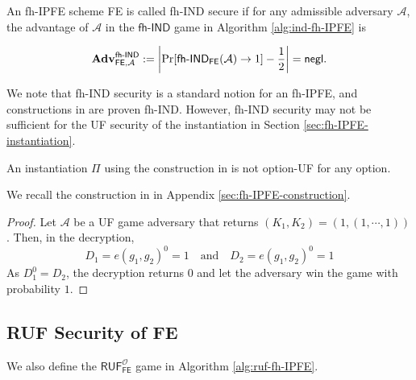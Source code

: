 \begin{definition}

	An fh-IPFE scheme \textsf{FE} is called fh-IND secure if for any admissible adversary $\mathcal{A}$, the advantage of $\mathcal{A}$ in the $\textsf{fh-IND}$ game in Algorithm \ref{alg:ind-fh-IPFE} is

\[
	\mathbf{Adv}_{\textsf{FE}, \mathcal{A}}^{\textsf{fh-IND}} := \left| \Pr[\textsf{fh-IND}_{\textsf{FE}}(\mathcal{A}) \to 1 ] - \frac{1}{2} \right| = \mathsf{negl}.
\]

\end{definition}

We note that fh-IND security is a standard notion for an fh-IPFE, and constructions in \cite{cryptoeprint:2015/1255, 10.1007/978-3-319-45871-7_24, cryptoeprint:2016/440} are proven fh-IND. However, fh-IND security may not be sufficient for the UF security of the instantiation in Section \ref{sec:fh-IPFE-instantiation}. 

\begin{theorem}
\label{thm:fh-IPFE-not-uf}
An instantiation $\Pi$ using the construction in \cite{cryptoeprint:2016/440} is not \textsf{option}-UF for any \textsf{option}.

\end{theorem}

\noindent We recall the construction in \cite{cryptoeprint:2016/440} in Appendix \ref{sec:fh-IPFE-construction}.

\begin{proof}

Let $\mathcal{A}$ be a \textsf{UF} game adversary that returns $(K_1, K_2) = (1, (1, \cdots, 1))$. Then, in the decryption,
\[
	D_1 = e(g_1, g_2)^{0} = 1 \quad \text{and} \quad D_2 = e(g_1, g_2)^0 = 1
\]
As $D_1^0 = D_2$, the decryption returns $0$ and let the adversary win the game with probability $1$.

\end{proof}


\subsection{RUF Security of \textsf{FE}}
\label{sec:security_analysis:fh-IPFE:ruf}

We also define the $\textsf{RUF}^{\mathcal{O}}_\textsf{FE}$ game in Algorithm \ref{alg:ruf-fh-IPFE}.

